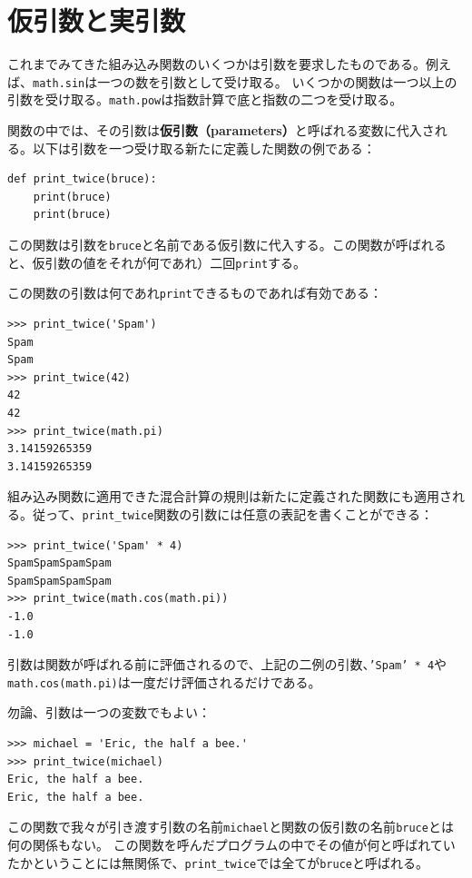 \documentclass[a4j,12pt,makeidx]{jbook}
\begin{document}
\section{仮引数と実引数}
これまでみてきた組み込み関数のいくつかは引数を要求したものである。例えば、{\tt math.sin}は一つの数を引数として受け取る。
いくつかの関数は一つ以上の引数を受け取る。{\tt math.pow}は指数計算で底と指数の二つを受け取る。\par
関数の中では、その引数は{\bf 仮引数（parameters）}と呼ばれる変数に代入される。以下は引数を一つ受け取る新たに定義した関数の例である：
\begin{verbatim}
def print_twice(bruce):
    print(bruce)
    print(bruce)
\end{verbatim}
この関数は引数を{\tt bruce}と名前である仮引数に代入する。この関数が呼ばれると、仮引数の値をそれが何であれ）二回{\tt print}する。\par
この関数の引数は何であれ{\tt print}できるものであれば有効である：
\begin{verbatim}
>>> print_twice('Spam')
Spam
Spam
>>> print_twice(42)
42
42
>>> print_twice(math.pi)
3.14159265359
3.14159265359
\end{verbatim} \par
組み込み関数に適用できた混合計算の規則は新たに定義された関数にも適用される。従って、{\tt print\_twice}関数の引数には任意の表記を書くことができる：
\begin{verbatim}
>>> print_twice('Spam' * 4)
SpamSpamSpamSpam
SpamSpamSpamSpam
>>> print_twice(math.cos(math.pi))
-1.0
-1.0
\end{verbatim} 
引数は関数が呼ばれる前に評価されるので、上記の二例の引数、{\tt 'Spam' * 4}や{\tt math.cos(math.pi)}は一度だけ評価されるだけである。\par
勿論、引数は一つの変数でもよい：
\begin{verbatim}
>>> michael = 'Eric, the half a bee.'
>>> print_twice(michael)
Eric, the half a bee.
Eric, the half a bee.
\end{verbatim}
この関数で我々が引き渡す引数の名前{\tt michael}と関数の仮引数の名前{\tt bruce}とは何の関係もない。
この関数を呼んだプログラムの中でその値が何と呼ばれていたかということには無関係で、{\tt print\_twice}では全てが{\tt bruce}と呼ばれる。
%
\end{document}
